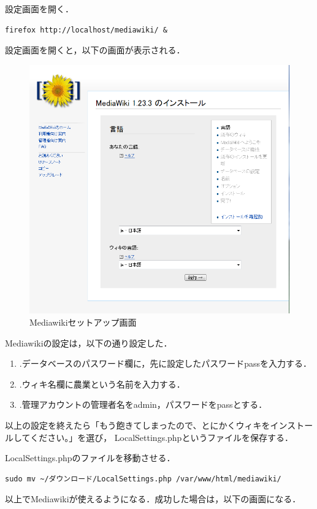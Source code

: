 設定画面を開く．
{\small
\begin{verbatim}
firefox http://localhost/mediawiki/ &
\end{verbatim}}
設定画面を開くと，以下の画面が表示される．
\begin{figure}[ht]
\centering
\includegraphics[width=14cm]{settei}
\caption{Mediawikiセットアップ画面}\label{settei}
\end{figure}

Mediawikiの設定は，以下の通り設定した．
\begin{enumerate}
\item .データベースのパスワード欄に，先に設定したパスワードpassを入力する．
\item .ウィキ名欄に農業という名前を入力する．
\item .管理アカウントの管理者名をadmin，パスワードをpassとする．
\end{enumerate}
以上の設定を終えたら「もう飽きてしまったので、とにかくウィキをインストールしてください。」を選び， LocalSettings.phpというファイルを保存する．


LocalSettings.phpのファイルを移動させる．
{\small
\begin{verbatim}
sudo mv ~/ダウンロード/LocalSettings.php /var/www/html/mediawiki/
\end{verbatim}}
以上でMediawikiが使えるようになる．成功した場合は，以下の画面になる．

